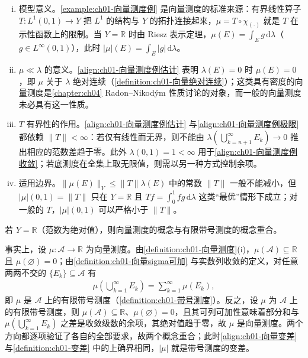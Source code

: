 \documentclass[../../main.tex]{subfiles}%
\begin{document}
\begin{remark}\label{remark:ch01-向量测度例注}
\begin{enumerate}[(i)]
\item 模型意义。\cref{example:ch01-向量测度例} 是向量测度的标准来源：有界线性算子 $T:L^1(0,1)\to Y$ 把 $L^1$ 的结构与 $Y$ 的拓扑连接起来，$\mu=T\circ\chi_{(\cdot)}$ 就是 $T$ 在示性函数上的限制。当 $Y=\mathbb{R}$ 时由 Riesz 表示定理，$\mu(E)=\int_E g\,\mathrm{d}\lambda$（$g\in L^\infty(0,1)$），此时 $|\mu|(E)=\int_E|g|\,\mathrm{d}\lambda$。
\item $\mu\ll\lambda$ 的意义。\eqref{align:ch01-向量测度例估计} 表明 $\lambda(E)=0$ 时 $\mu(E)=0$，即 $\mu$ 关于 $\lambda$ 绝对连续（\cref{definition:ch01-向量绝对连续}）；这类具有密度的向量测度是\cref{chapter:ch04} Radon--Nikodým 性质讨论的对象，而一般的向量测度未必具有这一性质。
\item $T$ 有界性的作用。\eqref{align:ch01-向量测度例估计} 与\eqref{align:ch01-向量测度例极限} 都依赖 $\|T\|<\infty$：若仅有线性而无界，则不能由 $\lambda\left(\bigcup_{k=n+1}^\infty E_k\right)\to0$ 推出相应的范数差趋于零。此外 $\lambda(0,1)=1<\infty$ 用于\eqref{align:ch01-向量测度例收敛}；若底测度在全集上取无限值，则需以另一种方式控制余项。
\item 适用边界。$\|\mu(E)\|_Y\leqslant\|T\|\lambda(E)$ 中的常数 $\|T\|$ 一般不能减小，但 $|\mu|(0,1)=\|T\|$ 只在 $Y=\mathbb{R}$ 且 $Tf=\int_0^1fg\,\mathrm{d}\lambda$ 这类“最优”情形下成立；对一般的 $T$，$|\mu|(0,1)$ 可以严格小于 $\|T\|$。
\end{enumerate}
\end{remark}

\begin{remark}\label{remark:ch01-向量测度Y=R}
若 $Y=\mathbb{R}$（范数为绝对值），则向量测度的概念与有限带号测度的概念重合。

事实上，设 $\mu:\mathcal{A}\to\mathbb{R}$ 为向量测度。由\cref{definition:ch01-向量测度}(i)，$\mu(\mathcal{A})\subseteq\mathbb{R}$ 且 $\mu(\varnothing)=0$；由\cref{definition:ch01-向量sigma可加} 与实数列收敛的定义，对任意两两不交的 $\{E_k\}\subseteq\mathcal{A}$ 有
\begin{align*}
\mu\left(\bigcup_{k=1}^\infty E_k\right)=\sum_{k=1}^\infty\mu(E_k),
\end{align*}
即 $\mu$ 是 $\mathcal{A}$ 上的有限带号测度（\cref{definition:ch01-带号测度}）。反之，设 $\mu$ 为 $\mathcal{A}$ 上的有限带号测度，则 $\mu(\mathcal{A})\subseteq\mathbb{R}$、$\mu(\varnothing)=0$，且其可列可加性意味着部分和与 $\mu\left(\bigcup_{k=1}^\infty E_k\right)$ 之差是收敛级数的余项，其绝对值趋于零，故 $\mu$ 是向量测度。两个方向都逐项验证了各自的全部要求，故两个概念重合；此时\eqref{align:ch01-向量变差} 与\cref{definition:ch01-变差} 中的上确界相同，$|\mu|$ 就是带号测度的变差。
\end{remark}
\end{document}
